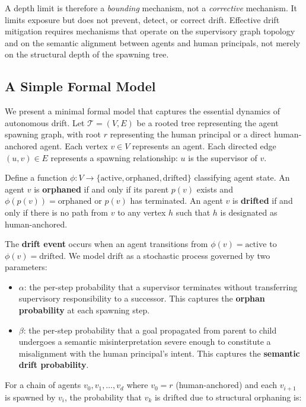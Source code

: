 A depth limit is therefore a \textit{bounding} mechanism, not a \textit{corrective} mechanism. It limits exposure but does not prevent, detect, or correct drift. Effective drift mitigation requires mechanisms that operate on the supervisory graph topology and on the semantic alignment between agents and human principals, not merely on the structural depth of the spawning tree.

\subsection{A Simple Formal Model}

We present a minimal formal model that captures the essential dynamics of autonomous drift. Let $\mathcal{T} = (V, E)$ be a rooted tree representing the agent spawning graph, with root $r$ representing the human principal or a direct human-anchored agent. Each vertex $v \in V$ represents an agent. Each directed edge $(u, v) \in E$ represents a spawning relationship: $u$ is the supervisor of $v$.

Define a function $\phi: V \to \{\text{active}, \text{orphaned}, \text{drifted}\}$ classifying agent state. An agent $v$ is \textbf{orphaned} if and only if its parent $p(v)$ exists and $\phi(p(v)) = \text{orphaned}$ or $p(v)$ has terminated. An agent $v$ is \textbf{drifted} if and only if there is no path from $v$ to any vertex $h$ such that $h$ is designated as human-anchored.

The \textbf{drift event} occurs when an agent transitions from $\phi(v) = \text{active}$ to $\phi(v) = \text{drifted}$. We model drift as a stochastic process governed by two parameters:

\begin{itemize}
    \item $\alpha$: the per-step probability that a supervisor terminates without transferring supervisory responsibility to a successor. This captures the \textbf{orphan probability} at each spawning step.
    \item $\beta$: the per-step probability that a goal propagated from parent to child undergoes a semantic misinterpretation severe enough to constitute a misalignment with the human principal's intent. This captures the \textbf{semantic drift probability}.
\end{itemize}

For a chain of agents $v_0, v_1, \ldots, v_d$ where $v_0 = r$ (human-anchored) and each $v_{i+1}$ is spawned by $v_i$, the probability that $v_k$ is drifted due to structural orphaning is:

